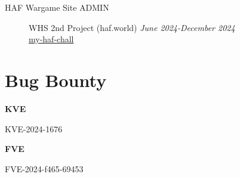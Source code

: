\documentclass[margin,line]{resume}
\begin{document}
\begin{resume}
\begin{description}
                \item[HAF Wargame Site ADMIN]\small{WHS 2nd Project (haf.world) \hfill \textsl{June 2024-December 2024}}\\
  	      		\faGithub\space\href{https://github.com/minchan02/WarGame}{my-haf-chall}
 			\vspace{2mm}
    \newpage
    \end{description}
    \vspace{2cm} 
    

        \section{\mysidestyle Bug Bounty}\vspace{2mm}
        \textbf{KVE}
        \vspace{1mm}
        \begin{list2}
          \item KVE-2024-1676
        \end{list2}
        
        \textbf{FVE}
        \vspace{1mm}
        \begin{list2}
          \item FVE-2024-f465-69453
        \end{list2}
\end{resume}   
\end{document}
